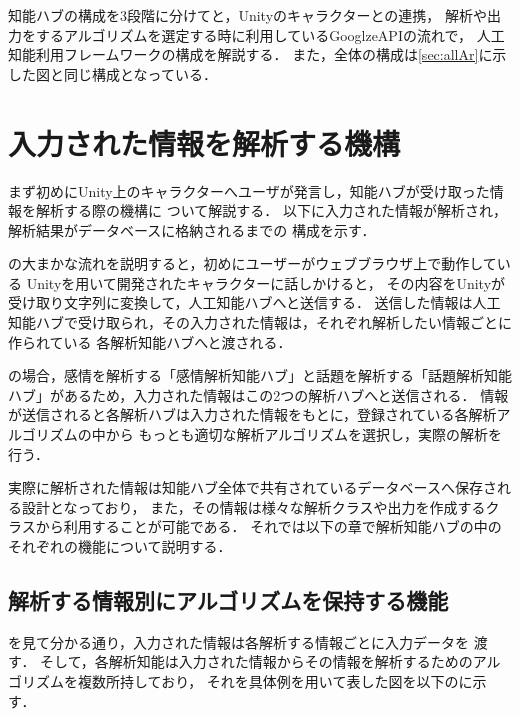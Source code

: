 
知能ハブの構成を3段階に分けてと，Unityのキャラクターとの連携，
解析や出力をするアルゴリズムを選定する時に利用しているGooglzeAPIの流れで，
人工知能利用フレームワークの構成を解説する．
また，全体の構成は\ref{sec:allAr}に示した図と同じ構成となっている．

\section{入力された情報を解析する機構}
まず初めにUnity上のキャラクターへユーザが発言し，知能ハブが受け取った情報を解析する際の機構に
ついて解説する．
以下に入力された情報が解析され，解析結果がデータベースに格納されるまでの
構成を示す．


の大まかな流れを説明すると，初めにユーザーがウェブブラウザ上で動作している
Unityを用いて開発されたキャラクターに話しかけると，
その内容をUnityが受け取り文字列に変換して，人工知能ハブへと送信する．
送信した情報は人工知能ハブで受け取られ，その入力された情報は，それぞれ解析したい情報ごとに作られている
各解析知能ハブへと渡される．

の場合，感情を解析する「感情解析知能ハブ」と話題を解析する「話題解析知能
ハブ」があるため，入力された情報はこの2つの解析ハブへと送信される．
情報が送信されると各解析ハブは入力された情報をもとに，登録されている各解析アルゴリズムの中から
もっとも適切な解析アルゴリズムを選択し，実際の解析を行う．

実際に解析された情報は知能ハブ全体で共有されているデータベースへ保存される設計となっており，
また，その情報は様々な解析クラスや出力を作成するクラスから利用することが可能である．
それでは以下の章で解析知能ハブの中のそれぞれの機能について説明する．

\subsection{解析する情報別にアルゴリズムを保持する機能}
を見て分かる通り，入力された情報は各解析する情報ごとに入力データを
渡す．
そして，各解析知能は入力された情報からその情報を解析するためのアルゴリズムを複数所持しており，
それを具体例を用いて表した図を以下のに示す．

